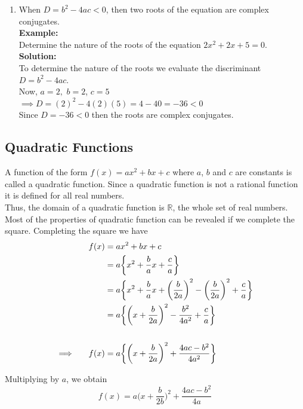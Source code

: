 \documentclass[11pt,a4paper]{article}
\begin{document}
\begin{enumerate}
\item When $D=b^2-4ac<0$, then two roots of the equation are complex conjugates.\\

\textbf{Example:}\\
Determine the nature of the roots of the equation $2x^2+2x+5=0$.\\

\textbf{Solution:}\\
To determine the nature of the roots we evaluate the discriminant $D=b^2-4ac$.\\

Now, $a=2,$ $b=2$, $c=5$\\

$\implies D=(2)^2-4(2)(5)=4-40=-36<0$\\
Since $D=-36<0$ then the roots are complex conjugates.\\
\end{enumerate}


\subsection{Quadratic Functions}
A function of the form $f(x)=ax^2+bx+c$ where $a$, $b$ and $c$ are constants is called a quadratic function. Since a quadratic function is not a rational function it is defined for all real numbers.\\
Thus, the domain of a quadratic function is $\mathbb{R}$, the whole set of real numbers.\\
Most of the properties of quadratic function can be revealed if we complete the square. Completing the square we have
\begin{align*}
f(x) & = ax^2+bx+c\\
     & = a\bigg\{x^2+\frac{b}{a}x+\frac{c}{a}\bigg\}\\
     & = a\bigg\{x^2+\frac{b}{a}x+\bigg(\frac{b}{2a}\bigg)^2-\bigg(\frac{b}{2a}\bigg)^2+\frac{c}{a}\bigg\}\\
     & = a\bigg\{\bigg(x+\frac{b}{2a}\bigg)^2-\frac{b^2}{4a^2}+\frac{c}{a}\bigg\}\\\\
\implies \hspace{0.5cm} f(x) & = a\bigg\{\bigg(x+\frac{b}{2a}\bigg)^2+\frac{4ac-b^2}{4a^2}\bigg\}\\
\end{align*}

Multiplying by $a$, we obtain
$$f(x)=a\bigg(x+\frac{b}{2b}\bigg)^2+\frac{4ac-b^2}{4a}$$
\end{document}
